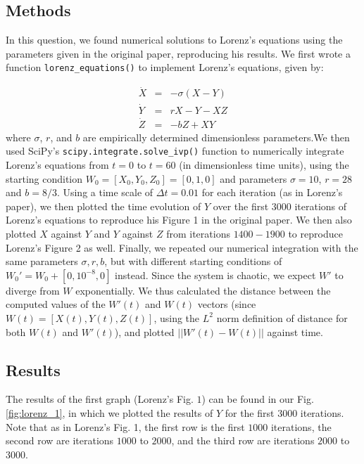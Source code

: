 \documentclass{article}
\begin{document}
\subsection*{Methods}

In this question, we found numerical solutions to Lorenz's equations using the parameters given in the original paper, reproducing his results. We first wrote a function \texttt{lorenz\_equations()} to implement Lorenz's equations, given by:

\begin{eqnarray}
\dot X &=& -\sigma(X-Y)\\ \nonumber
\dot Y &=& rX -Y - XZ\\ \nonumber
\dot Z &=& -bZ + XY \nonumber
\end{eqnarray}
where $\sigma$, $r$, and $b$ are empirically determined dimensionless parameters.We then used SciPy's \texttt{scipy.integrate.solve\_ivp()} function to numerically integrate Lorenz's equations from $t = 0$ to $t = 60$ (in dimensionless time units), using the starting condition $W_0 = [X_0, Y_0, Z_0] = [0, 1, 0]$ and parameters $\sigma = 10$, $r = 28$ and $b = 8/3$. Using a time scale of $\Delta t = 0.01$ for each iteration (as in Lorenz's paper), we then plotted the time evolution of $Y$ over the first $3000$ iterations of Lorenz's equations to reproduce his Figure 1 in the original paper.
\smallbreak
We then also plotted $X$ against $Y$ and $Y$ against $Z$ from iterations $1400 - 1900$ to reproduce Lorenz's Figure 2 as well. Finally, we repeated our numerical integration with the same parameters $\sigma, r, b$, but with different starting conditions of $W_0' = W_0 + [0, 10^{-8}, 0]$ instead. Since the system is chaotic, we expect $W'$ to diverge from $W$ exponentially. We thus calculated the distance between the computed values of the $W'(t)$ and $W(t)$ vectors (since $W(t) = [X(t), Y(t), Z(t)]$, using the $L^2$ norm definition of distance for both $W(t)$ and $W'(t)$), and plotted $||W'(t) - W(t)||$ against time.

\subsection*{Results}

The results of the first graph (Lorenz's Fig. $1$) can be found in our Fig. \ref{fig:lorenz_1}, in which we plotted the results of $Y$ for the first $3000$ iterations. Note that as in Lorenz's Fig. 1, the first row is the first $1000$ iterations, the second row are iterations $1000$ to $2000$, and the third row are iterations $2000$ to $3000$.
\end{document}
